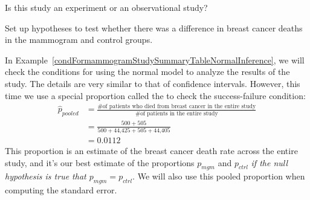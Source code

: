 \begin{exercisewrap}
\begin{nexercise}
Is this study an experiment or an observational study?\footnotemark
\end{nexercise}
\end{exercisewrap}

\begin{exercisewrap}
\begin{nexercise} \label{htFormammogramStudySummaryTable}
Set up hypotheses to test whether there was a difference
in breast cancer deaths in the mammogram and control groups.\footnotemark
\end{nexercise}
\end{exercisewrap}

In Example~\ref{condFormammogramStudySummaryTableNormalInference}, we will check the conditions for using the normal model to analyze the results of the study. The details are very similar to that of confidence intervals. However, this time we use a special proportion called the  to check the success-failure condition:
\begin{align*}
\hat{p}_{\textit{pooled}}
    &= \frac
        {\text{\# of patients who died from breast cancer in the
            entire study}}
        {\text{\# of patients in the entire study}} \\
	&= \frac{500 + 505}{500 + \text{44,425} + 505 + \text{44,405}} \\
	&= 0.0112
\end{align*}
This proportion is an estimate of the breast cancer death rate across the entire study, and it's our best estimate of the proportions $p_{mgm}$ and $p_{ctrl}$ \emph{if the null hypothesis is true that $p_{mgm} = p_{ctrl}$}. We will also use this pooled proportion when computing the standard error.

